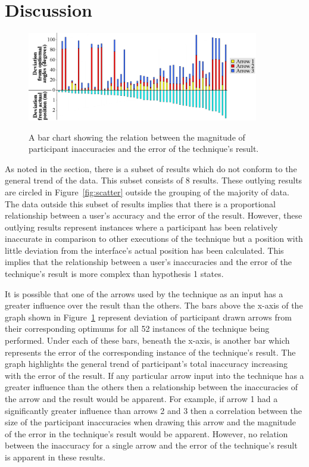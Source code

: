 \documentclass{bmcart}
\begin{document}
\section*{Discussion}\label{sec:discussion}

\begin{figure}[bp]
   \centering
   \caption{A bar chart showing the relation between the magnitude of participant inaccuracies and the error of the technique's result.}
   \includegraphics[width=0.9\textwidth]{figures/total_deviation_vs_angle_deviations.png}
   \label{fig:barReflect}
\end{figure}

As noted in the  section, there is a subset of results which do not conform to the general trend of the data.
This subset consists of 8 results.
These outlying results are circled in Figure~\ref{fig:scatter} outside the grouping of the majority of data.
The data outside this subset of results implies that there is a proportional relationship between a user's accuracy and the error of the result.
However, these outlying results represent instances where a participant has been relatively inaccurate in comparison to other executions of the technique but a position with little deviation from the interface's actual position has been calculated.
This implies that the relationship between a user's inaccuracies and the error of the technique's result is more complex than hypothesis 1 states.

It is possible that one of the arrows used by the technique as an input has a greater influence over the result than the others.
The bars above the x-axis of the graph shown in Figure~\ref{fig:barReflect} represent deviation of participant drawn arrows from their corresponding optimums for all 52 instances of the technique being performed.
Under each of these bars, beneath the x-axis, is another bar which represents the error of the corresponding instance of the technique's result.
The graph highlights the general trend of participant's total inaccuracy increasing with the error of the result.
If any particular arrow input into the technique has a greater influence than the others then a relationship between the inaccuracies of the arrow and the result would be apparent.
For example, if arrow 1 had a significantly greater influence than arrows 2 and 3 then a correlation between the size of the participant inaccuracies when drawing this arrow and the magnitude of the error in the technique's result would be apparent.
However, no relation between the inaccuracy for a single arrow and the error of the technique's result is apparent in these results.
\end{document}
